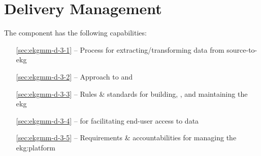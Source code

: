 \chapter{ Delivery Management}\label{ch:ekgmm-d-3}

The  component has the following capabilities:

\begin{itemize}[leftmargin=.5in]
  \item [\ref{sec:ekgmm-d-3-1}]  -- Process for extracting/transforming data from source-to-\gls{ekg}
  \item [\ref{sec:ekgmm-d-3-2}]  -- Approach to  and 
  \item [\ref{sec:ekgmm-d-3-3}]  -- Rules \& standards for building, , and maintaining the \gls{ekg}
  \item [\ref{sec:ekgmm-d-3-4}]  --  for facilitating end-user access to data
  \item [\ref{sec:ekgmm-d-3-5}]  -- Requirements \& accountabilities for managing the \gls{ekg:platform}
\end{itemize}







